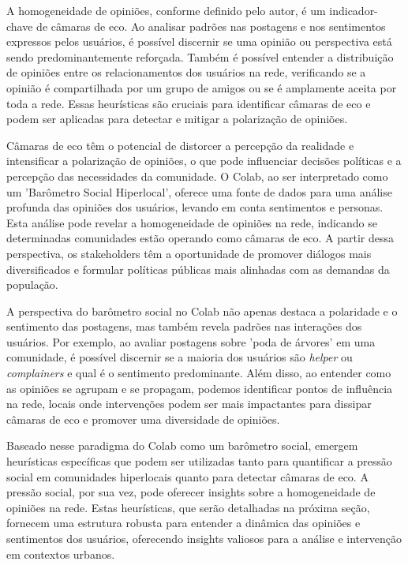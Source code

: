 A homogeneidade de opiniões, conforme definido pelo autor, é um indicador-chave de câmaras de eco. Ao analisar padrões nas postagens e nos sentimentos expressos pelos usuários, é possível discernir se uma opinião ou perspectiva está sendo predominantemente reforçada. Também é possível entender a distribuição de opiniões entre os relacionamentos dos usuários na rede, verificando se a opinião é compartilhada por um grupo de amigos ou se é amplamente aceita por toda a rede. Essas heurísticas são cruciais para identificar câmaras de eco e podem ser aplicadas para detectar e mitigar a polarização de opiniões.

Câmaras de eco têm o potencial de distorcer a percepção da realidade e intensificar a polarização de opiniões, o que pode influenciar decisões políticas e a percepção das necessidades da comunidade. O Colab, ao ser interpretado como um 'Barômetro Social Hiperlocal', oferece uma fonte de dados para uma análise profunda das opiniões dos usuários, levando em conta sentimentos e personas. Esta análise pode revelar a homogeneidade de opiniões na rede, indicando se determinadas comunidades estão operando como câmaras de eco. A partir dessa perspectiva, os stakeholders têm a oportunidade de promover diálogos mais diversificados e formular políticas públicas mais alinhadas com as demandas da população.

A perspectiva do barômetro social no Colab não apenas destaca a polaridade e o sentimento das postagens, mas também revela padrões nas interações dos usuários. Por exemplo, ao avaliar postagens sobre 'poda de árvores' em uma comunidade, é possível discernir se a maioria dos usuários são \textit{helper} ou \textit{complainers} e qual é o sentimento predominante. Além disso, ao entender como as opiniões se agrupam e se propagam, podemos identificar pontos de influência na rede, locais onde intervenções podem ser mais impactantes para dissipar câmaras de eco e promover uma diversidade de opiniões.

Baseado nesse paradigma do Colab como um barômetro social, emergem heurísticas específicas que podem ser utilizadas tanto para quantificar a pressão social em comunidades hiperlocais quanto para detectar câmaras de eco. A pressão social, por sua vez, pode oferecer insights sobre a homogeneidade de opiniões na rede. Estas heurísticas, que serão detalhadas na próxima seção, fornecem uma estrutura robusta para entender a dinâmica das opiniões e sentimentos dos usuários, oferecendo insights valiosos para a análise e intervenção em contextos urbanos.

